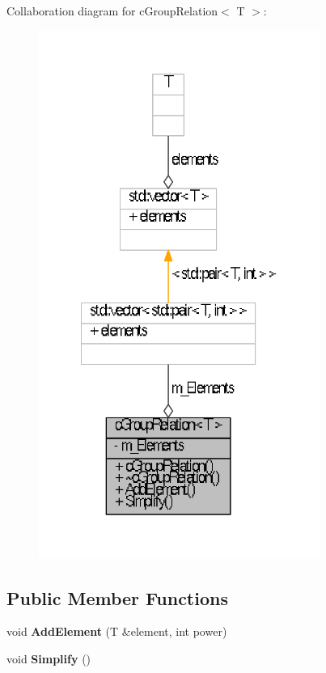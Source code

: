 \-Collaboration diagram for c\-Group\-Relation$<$ \-T $>$\-:
\nopagebreak
\begin{figure}[H]
\begin{center}
\leavevmode
\includegraphics[width=260pt]{classcGroupRelation__coll__graph}
\end{center}
\end{figure}
\subsection*{\-Public \-Member \-Functions}
\begin{DoxyCompactItemize}
\item 
\hypertarget{classcGroupRelation_aeae9fe8f02b40a3cf1b7f73abee2b9cd}{void {\bfseries \-Add\-Element} (\-T \&element, int power)}\label{classcGroupRelation_aeae9fe8f02b40a3cf1b7f73abee2b9cd}

\item 
\hypertarget{classcGroupRelation_ac93e1c0794cbca8e574cbf1c4255c675}{void {\bfseries \-Simplify} ()}\label{classcGroupRelation_ac93e1c0794cbca8e574cbf1c4255c675}

\end{DoxyCompactItemize}
